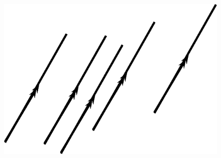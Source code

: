 	\begin{figure}[H] %
    \begin{center}
    \label{m39370*id316228!!!underscore!!!media}\label{m39370*id316228!!!underscore!!!printimage}\includegraphics{col11306.imgs/m39370_MG10C13_010.png} %
        
      \vspace{2pt}
    \vspace{.1in}
    
    \end{center}

 \end{figure}   

    \addtocounter{footnote}{-0}
    

